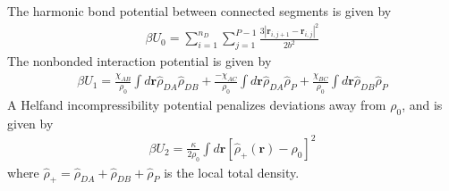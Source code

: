\documentclass{article}
\begin{document}
The harmonic bond potential between connected segments is given by
\begin{align*}
  \beta U_0 =   \sum_{i=1}^{n_D}    \sum_{j=1}^{P-1}
    \frac{3 \left| \mathbf{r}_{i,j+1} - \mathbf{r}_{i,j} \right| ^ 2 }
         { 2 b^2 }
\end{align*}
The nonbonded interaction potential is given by
\begin{align*}
  \beta U_1 =
    \frac{\chi_{AB}}{\rho_0} \int d\mathbf{r} \hat{\rho}_{DA} \hat{\rho}_{DB}
    + \frac{- \chi_{AC}}{\rho_0} \int d\mathbf{r} \hat{\rho}_{DA} \hat{\rho}_P
    + \frac{\chi_{BC}}{\rho_0} \int d\mathbf{r} \hat{\rho}_{DB} \hat{\rho}_P
\end{align*}
A Helfand incompressibility potential penalizes deviations away from $\rho_0$,
  and is given by
\begin{align*}
  \beta U_2 = \frac{\kappa}{2 \rho_0} \int d \mathbf{r}
    \left[ \hat{\rho}_+ (\mathbf{r}) - \rho_0 \right] ^ 2
\end{align*}
where $\hat{\rho}_+ = \hat{\rho}_{DA} + \hat{\rho}_{DB} + \hat{\rho}_P$
  is the local total density.
\end{document}
